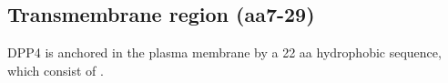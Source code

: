 \subsection{Transmembrane region (aa7-29)}

DPP4 is anchored in the plasma membrane by a 22 aa hydrophobic sequence, which consist of \alpha. \cite{Hong_1990}